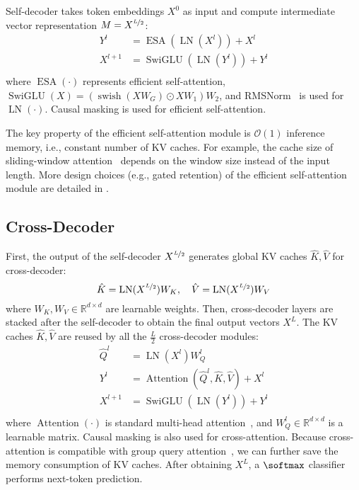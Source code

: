 Self-decoder takes token embeddings $X^0$ as input and compute intermediate vector representation $M=X^{\nicefrac{L}{2}}$:
\begin{equation}
\begin{aligned}
Y^{l}&=\operatorname{ESA}(\operatorname{LN}(X^{l}))+X^{l}\\
X^{l+1}&=\operatorname{SwiGLU}(\operatorname{LN}(Y^{l}))+Y^{l}\\
\end{aligned}
\end{equation}
where $\operatorname{ESA}(\cdot)$ represents efficient self-attention, $\operatorname{SwiGLU}(X) = (\operatorname{swish}(X W_G)\odot X W_1)W_2$, and RMSNorm~\cite{rmsnorm} is used for $\operatorname{LN}(\cdot)$.
Causal masking is used for efficient self-attention.

The key property of the efficient self-attention module is $\mathcal{O}(1)$ inference memory, i.e., constant number of KV caches.
For example, the cache size of sliding-window attention~\cite{sparsetransformer} depends on the window size instead of the input length.
More design choices (e.g., gated retention) of the efficient self-attention module are detailed in .

\subsection{Cross-Decoder}
\label{sec:cross:decoder}

First, the output of the self-decoder $X^{\nicefrac{L}{2}}$ generates global KV caches $\hat{K}, \hat{V}$ for cross-decoder:
\begin{equation}
\hat{K} = \operatorname{LN}(X^{\nicefrac{L}{2}}) W_K ,\quad \hat{V} = \operatorname{LN}(X^{\nicefrac{L}{2}}) W_V
\end{equation}
where $W_K, W_V \in \mathbb{R}^{d\times d}$ are learnable weights.
Then, cross-decoder layers are stacked after the self-decoder to obtain the final output vectors $X^{L}$.
The KV caches $\hat{K}, \hat{V}$ are reused by all the $\frac{L}{2}$ cross-decoder modules:
\begin{equation}
\begin{aligned}
\hat{Q}^{l} &= \operatorname{LN}(X^{l}) W_Q^l \\
Y^{l}&=\operatorname{Attention}(\hat{Q}^{l}, \hat{K}, \hat{V})+X^{l}\\
X^{l+1}&=\operatorname{SwiGLU}(\operatorname{LN}(Y^{l}))+Y^{l}\\
\label{eq:cross:decoder}
\end{aligned}
\end{equation}
where $\operatorname{Attention}(\cdot)$ is standard multi-head attention~\cite{transformer}, and $W_Q^l \in \mathbb{R}^{d\times d}$ is a learnable matrix.
Causal masking is also used for cross-attention.
Because cross-attention is compatible with group query attention~\cite{gqa}, we can further save the memory consumption of KV caches.
After obtaining $X^L$, a $\softmax$ classifier performs next-token prediction.

